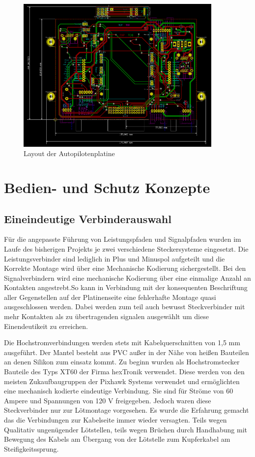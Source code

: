 \begin{figure}[H]
\centering
\includegraphics[width=0.9\textwidth]{bilder/Centerbox/Centerbox-Rear-Pixhawk_AUVSI_2016_rev-01-layout.png} 
\caption{Layout der Autopilotenplatine} 
\label{fig:Layout der Autopilotenplatine}
\end{figure}

\section{Bedien- und Schutz Konzepte}

\subsection{Eineindeutige Verbinderauswahl}

Für die angepasste Führung von Leistungspfaden und Signalpfaden wurden im Laufe des bisherigen Projekts je zwei verschiedene Steckersysteme eingesetzt.
Die Leistungsverbinder sind lediglich in Plus und Minuspol aufgeteilt und die Korrekte Montage wird über eine Mechanische Kodierung sichergestellt.
Bei den Signalverbindern wird eine mechanische Kodierung über eine einmalige Anzahl an Kontakten angestrebt.So kann in Verbindung mit der konsequenten Beschriftung aller Gegenstellen auf der Platinenseite eine fehlerhafte Montage quasi ausgeschlossen werden. Dabei werden zum teil auch bewusst Steckverbinder mit mehr Kontakten als zu übertragenden signalen ausgewählt um diese Einendeutikeit zu erreichen.

Die Hochstromverbindungen werden stets mit Kabelquerschnitten von 1,5 mm ausgeführt. Der Mantel besteht aus PVC außer in der Nähe von heißen Bauteilen an denen Silikon zum einsatz kommt.
Zu beginn wurden als Hochstromstecker Bauteile des Typs XT60 der Firma hexTronik verwendet.
Diese werden von den meisten Zukaufbaugruppen der Pixhawk Systems verwendet und ermöglichten eine mechanisch kodierte eindeutige Verbindung.
Sie sind für Ströme von 60 Ampere und Spannungen von 120 V freigegeben.
Jedoch waren diese Steckverbinder nur zur Lötmontage vorgesehen. Es wurde die Erfahrung gemacht das die Verbindungen zur Kabelseite immer wieder versagten. Teils wegen Qualitativ ungenügender Lötstellen, teils wegen Brüchen durch Handhabung mit Bewegung des Kabels am Übergang von der Lötstelle zum Kupferkabel am Steifigkeitssprung.


